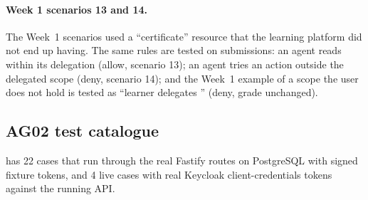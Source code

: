 \paragraph{Week 1 scenarios 13 and 14.} The Week~1 scenarios used a ``certificate'' resource that the learning platform did not end up having. The same rules are tested on submissions: an agent reads within its delegation (allow, scenario 13); an agent tries an action outside the delegated scope (deny, scenario 14); and the Week~1 example of a scope the user does not hold is tested as ``learner delegates '' (deny, grade unchanged).

\subsection{AG02 test catalogue}
 has 22 cases that run through the real Fastify routes on PostgreSQL with signed fixture tokens, and 4 live cases with real Keycloak client-credentials tokens against the running API.

